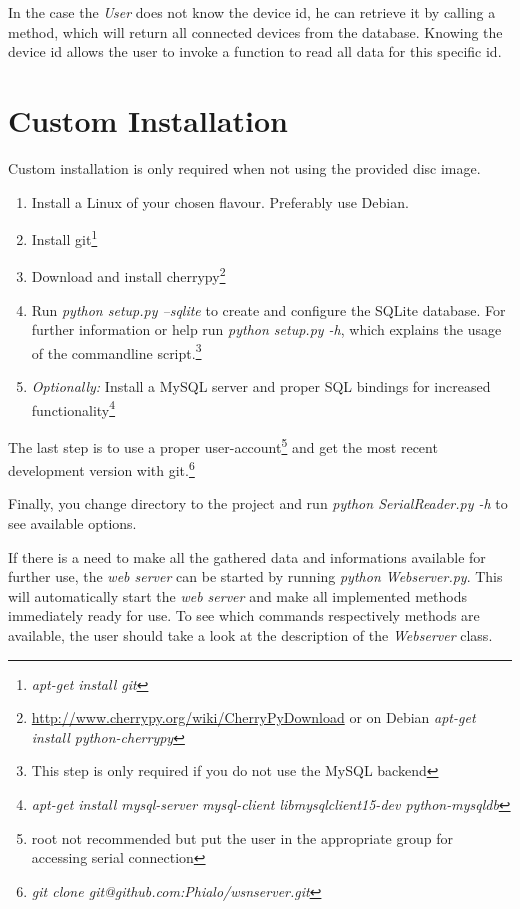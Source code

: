 In the case the \textit{User} does not know the device id, he can retrieve it by calling a method, which will return all connected devices from the database. Knowing the device id allows the user to invoke a function to read all data for this specific id.

\newpage
\section{Custom Installation}
\label{sec:install}

Custom installation is only required when not using the provided disc image.

\begin{enumerate}
    \item Install a Linux of your chosen flavour. Preferably use Debian.
    \item Install git\footnote{\textit{apt-get install git}}
    \item Download and install cherrypy\footnote{\url{http://www.cherrypy.org/wiki/CherryPyDownload} or on Debian \textit{apt-get install python-cherrypy}}
    \item Run \textit{python setup.py --sqlite} to create and configure the SQLite database. For further information or help run \textit{python setup.py -h}, which explains the usage of the commandline script.\footnote{This step is only required if you do not use the MySQL backend}
    \item \textit{Optionally:} Install a MySQL server and proper SQL bindings for increased functionality\footnote{\textit{apt-get install mysql-server mysql-client libmysqlclient15-dev python-mysqldb}}
\end{enumerate}

The last step is to use a proper user-account\footnote{root not recommended but put the user in the appropriate group for accessing serial connection} and
get the most recent development version with git.\footnote{\textit{git clone git@github.com:Phialo/wsnserver.git}}

Finally, you change directory to the project and run \textit{python SerialReader.py -h} to see available options.

If there is a need to make all the gathered data and informations available for further use, the \textit{web server} can be started by running \textit{python Webserver.py}. This will automatically start the 
\textit{web server} and make all implemented methods immediately ready for use. To see which commands respectively methods are available, the user should take a look at the description of the \textit{Webserver} class.

